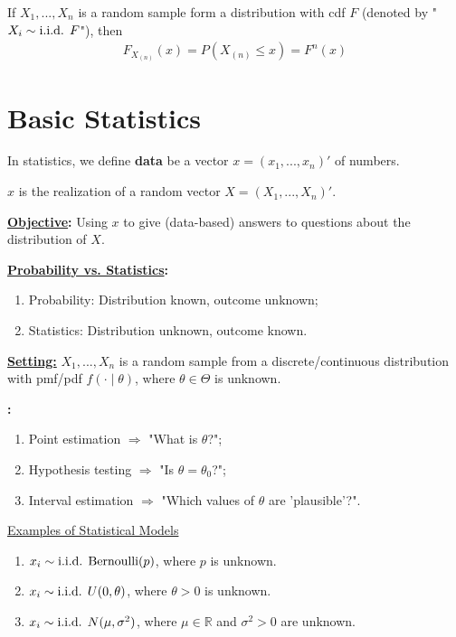 \documentclass[11pt]{elegantbook}
\begin{document}
\begin{proposition}[Distribution of $X_{n}=\max_{i=1,...,n}X_i$]
    If $X_1,...,X_n$ is a random sample form a distribution with cdf $F$ (denoted by "$X_i\sim \textnormal{i.i.d. } F$"), then
    \begin{equation}
        \begin{aligned}
            F_{X_{(n)}}(x)=P(X_{(n)}\leq x)=F^n(x)
        \end{aligned}
        \nonumber
    \end{equation}
\end{proposition}


\section{Basic Statistics}
In statistics, we define \textbf{data} be a vector $x=(x_1,...,x_n)'$ of numbers.
\begin{assumption}
    $x$ is the realization of a random vector $X=(X_1,...,X_n)'$.
\end{assumption}

\textbf{\underline{Objective}:} Using $x$ to give (data-based) answers to questions about the distribution of $X$.

\textbf{\underline{Probability vs. Statistics}:}
\begin{enumerate}[$\circ$]
    \item Probability: Distribution known, outcome unknown;
    \item Statistics: Distribution unknown, outcome known.
\end{enumerate}

\textbf{\underline{Setting:}} $X_1,...,X_n$ is a random sample from a discrete/continuous distribution with pmf/pdf $f(\cdot\mid \theta)$, where $\theta\in\Theta$ is unknown.

\textbf{:}
\begin{enumerate}[$\circ$]
    \item Point estimation $\Rightarrow$ "What is $\theta$?";
    \item Hypothesis testing $\Rightarrow$ "Is $\theta=\theta_0$?";
    \item Interval estimation $\Rightarrow$ "Which values of $\theta$ are 'plausible'?".
\end{enumerate}

\begin{example}
    \underline{Examples of Statistical Models}
    \begin{enumerate}[(1).]
        \item $x_i\sim \textnormal{i.i.d. } \textnormal{Bernoulli}(p)$, where $p$ is unknown.
        \item $x_i\sim \textnormal{i.i.d. } U(0,\theta)$, where $\theta>0$ is unknown.
        \item $x_i\sim \textnormal{i.i.d. } N(\mu,\sigma^2)$, where $\mu\in \mathbb{R}$ and $\sigma^2>0$ are unknown.
    \end{enumerate}
\end{example}
\end{document}
